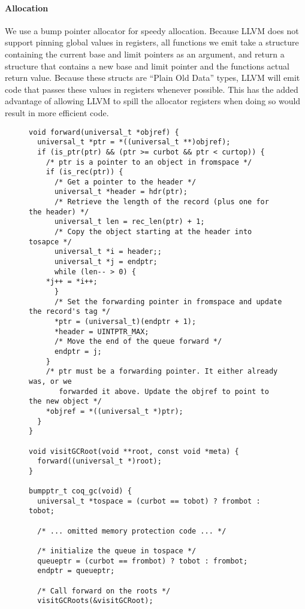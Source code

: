 \documentclass{article}
\begin{document}
\paragraph{Allocation} We use a bump pointer allocator for speedy allocation. Because LLVM does not support pinning global values in registers, all functions we emit take a structure containing the current base and limit pointers as an argument, and return a structure that contains a new base and limit pointer and the functions actual return value. Because these structs are ``Plain Old Data'' types, LLVM will emit code that passes these values in registers whenever possible. This has the added advantage of allowing LLVM to spill the allocator registers when doing so would result in more efficient code.

\begin{figure}
\begin{lstlisting}
void forward(universal_t *objref) {
  universal_t *ptr = *((universal_t **)objref);
  if (is_ptr(ptr) && (ptr >= curbot && ptr < curtop)) {
    /* ptr is a pointer to an object in fromspace */
    if (is_rec(ptr)) {
      /* Get a pointer to the header */
      universal_t *header = hdr(ptr);
      /* Retrieve the length of the record (plus one for the header) */
      universal_t len = rec_len(ptr) + 1;
      /* Copy the object starting at the header into tosapce */
      universal_t *i = header;;
      universal_t *j = endptr;
      while (len-- > 0) {
	*j++ = *i++;
      }
      /* Set the forwarding pointer in fromspace and update the record's tag */
      *ptr = (universal_t)(endptr + 1);
      *header = UINTPTR_MAX;
      /* Move the end of the queue forward */
      endptr = j;
    }
    /* ptr must be a forwarding pointer. It either already was, or we 
       forwarded it above. Update the objref to point to the new object */
    *objref = *((universal_t *)ptr);
  }
}

void visitGCRoot(void **root, const void *meta) {
  forward((universal_t *)root);
}

bumpptr_t coq_gc(void) {
  universal_t *tospace = (curbot == tobot) ? frombot : tobot;

  /* ... omitted memory protection code ... */

  /* initialize the queue in tospace */
  queueptr = (curbot == frombot) ? tobot : frombot;
  endptr = queueptr;

  /* Call forward on the roots */
  visitGCRoots(&visitGCRoot);


\end{lstlisting}
\end{figure}
\end{document}
